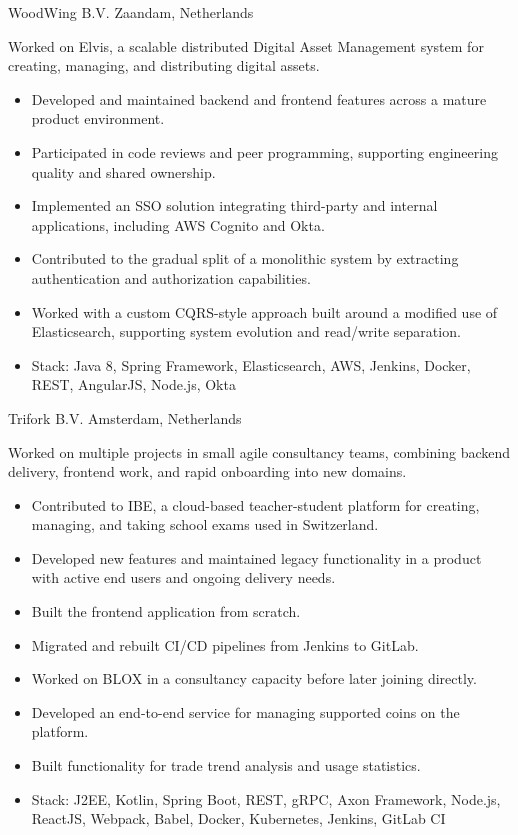 \documentclass[10pt,a4paper,sans]{moderncv} %
\begin{document}
{WoodWing B.V.}
{Zaandam, Netherlands}
{}{
Worked on Elvis, a scalable distributed Digital Asset Management system for creating, managing, and distributing digital assets.
\begin{itemize}
 \item Developed and maintained backend and frontend features across a mature product environment.
 \item Participated in code reviews and peer programming, supporting engineering quality and shared ownership.
 \item Implemented an SSO solution integrating third-party and internal applications, including AWS Cognito and Okta.
 \item Contributed to the gradual split of a monolithic system by extracting authentication and authorization capabilities.
 \item Worked with a custom CQRS-style approach built around a modified use of Elasticsearch, supporting system evolution and read/write separation.
 \item Stack: Java 8, Spring Framework, Elasticsearch, AWS, Jenkins, Docker, REST, AngularJS, Node.js, Okta
\end{itemize}
}

{Trifork B.V.}
{Amsterdam, Netherlands}
{}{
Worked on multiple projects in small agile consultancy teams, combining backend delivery, frontend work, and rapid onboarding into new domains.
\begin{itemize}
 \item Contributed to IBE, a cloud-based teacher-student platform for creating, managing, and taking school exams used in Switzerland.
 \item Developed new features and maintained legacy functionality in a product with active end users and ongoing delivery needs.
 \item Built the frontend application from scratch.
 \item Migrated and rebuilt CI/CD pipelines from Jenkins to GitLab.
 \item Worked on BLOX in a consultancy capacity before later joining directly.
 \item Developed an end-to-end service for managing supported coins on the platform.
 \item Built functionality for trade trend analysis and usage statistics.
 \item Stack: J2EE, Kotlin, Spring Boot, REST, gRPC, Axon Framework, Node.js, ReactJS, Webpack, Babel, Docker, Kubernetes, Jenkins, GitLab CI
\end{itemize}
}
\end{document}
